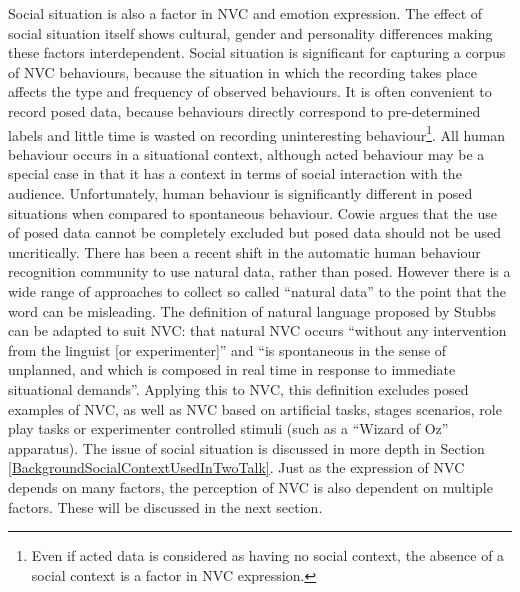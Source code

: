 
Social situation is also a factor in \ac{NVC} and emotion expression. The effect of social situation itself shows cultural, gender and personality differences \cite{Argyle1994} making these factors interdependent. Social situation is significant for capturing a corpus of \ac{NVC} behaviours, because the situation in which the recording takes place affects the type and frequency of observed behaviours. It is often convenient to record posed data, because behaviours directly correspond to pre-determined labels and little time is wasted on recording uninteresting behaviour\footnote{Even if acted data is considered as having no social context, the absence of a social context is a factor in \ac{NVC} expression.}. All human behaviour occurs in a situational context, although acted behaviour may be a special case in that it has a context in terms of social interaction with the audience. Unfortunately, human behaviour is significantly different in posed situations when compared to spontaneous behaviour. Cowie \cite{Cowie2005} argues that the use of posed data cannot be completely excluded but posed data should not be used uncritically. There has been a recent shift in the automatic human behaviour recognition community to use natural data, rather than posed. However there is a wide range of approaches to collect so called ``natural data'' to the point that the word can be misleading. The definition of natural language proposed by Stubbs \cite{Stubbs1983} can be adapted to suit \ac{NVC}: that natural \ac{NVC} occurs ``without any intervention from the linguist [or experimenter]'' and ``is spontaneous in the sense of unplanned, and which is composed in real time in response to immediate situational demands''. Applying this to \ac{NVC}, this definition excludes posed examples of \ac{NVC}, as well as \ac{NVC} based on artificial tasks, stages scenarios, role play tasks or experimenter controlled stimuli (such as a ``Wizard of Oz'' apparatus). The issue of social situation is discussed in more depth in Section \ref{BackgroundSocialContextUsedInTwoTalk}. Just as the expression of \ac{NVC} depends on many factors, the perception of \ac{NVC} is also dependent on multiple factors. These will be discussed in the next section.

